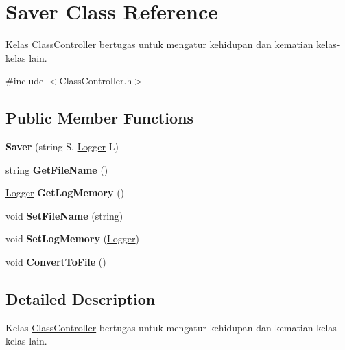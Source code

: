 \hypertarget{class_saver}{}\section{Saver Class Reference}
\label{class_saver}


Kelas \hyperlink{class_class_controller}{Class\+Controller} bertugas untuk mengatur kehidupan dan kematian kelas-\/kelas lain.  




{\ttfamily \#include $<$Class\+Controller.\+h$>$}

\subsection*{Public Member Functions}
\begin{DoxyCompactItemize}
\item 
\hypertarget{class_saver_a7212120d1c632eeb4086f2d2459d3d85}{}{\bfseries Saver} (string S, \hyperlink{class_logger}{Logger} L)\label{class_saver_a7212120d1c632eeb4086f2d2459d3d85}

\item 
\hypertarget{class_saver_a9bebb09eceb5b95bf4515a6cb9cc7f71}{}string {\bfseries Get\+File\+Name} ()\label{class_saver_a9bebb09eceb5b95bf4515a6cb9cc7f71}

\item 
\hypertarget{class_saver_a056da2a95f516e5cf9601aa78929758b}{}\hyperlink{class_logger}{Logger} {\bfseries Get\+Log\+Memory} ()\label{class_saver_a056da2a95f516e5cf9601aa78929758b}

\item 
\hypertarget{class_saver_a0b712d7e487acee98c0bdaebea59d546}{}void {\bfseries Set\+File\+Name} (string)\label{class_saver_a0b712d7e487acee98c0bdaebea59d546}

\item 
\hypertarget{class_saver_ad7cc8e090549e00fd739a84861c241fb}{}void {\bfseries Set\+Log\+Memory} (\hyperlink{class_logger}{Logger})\label{class_saver_ad7cc8e090549e00fd739a84861c241fb}

\item 
\hypertarget{class_saver_aabeb74d91699a078e367ec2f7903792b}{}void {\bfseries Convert\+To\+File} ()\label{class_saver_aabeb74d91699a078e367ec2f7903792b}

\end{DoxyCompactItemize}


\subsection{Detailed Description}
Kelas \hyperlink{class_class_controller}{Class\+Controller} bertugas untuk mengatur kehidupan dan kematian kelas-\/kelas lain. 

